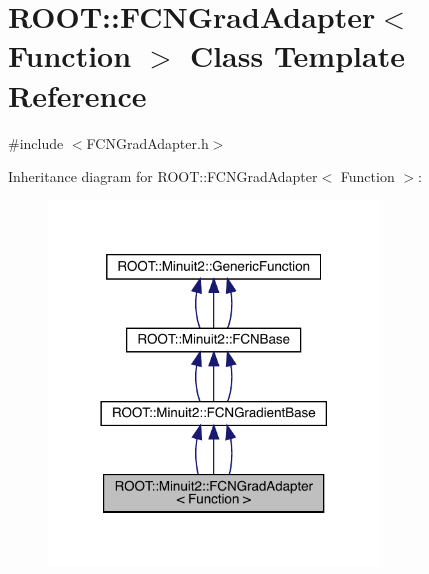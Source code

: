\hypertarget{classROOT_1_1Minuit2_1_1FCNGradAdapter}{}\section{R\+O\+OT\+:\+:F\+C\+N\+Grad\+Adapter$<$ Function $>$ Class Template Reference}
\label{classROOT_1_1Minuit2_1_1FCNGradAdapter}


{\ttfamily \#include $<$F\+C\+N\+Grad\+Adapter.\+h$>$}



Inheritance diagram for R\+O\+OT\+:\+:F\+C\+N\+Grad\+Adapter$<$ Function $>$\+:
\nopagebreak
\begin{figure}[H]
\begin{center}
\leavevmode
\includegraphics[width=249pt]{d5/dde/classROOT_1_1Minuit2_1_1FCNGradAdapter__inherit__graph}
\end{center}
\end{figure}



